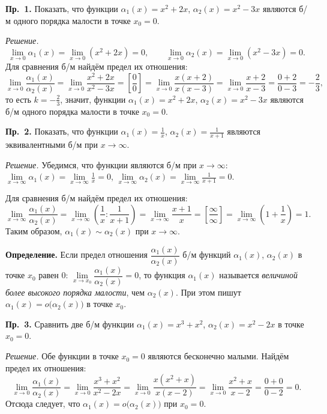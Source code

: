 \documentclass[a4paper,11pt]{article}
\begin{document}
\textbf{Пр.~1.} Показать, что функции $\alpha_1(x) = x^2 + 2x$,
$\alpha_2(x) = x^2 - 3x$ являются б/м одного порядка малости в точке $x_0 = 0$.

\textit{Решение.}
\[
  \lim_{x \to 0} \alpha_1(x) = \lim_{x \to 0} (x^2 + 2x) = 0, \qquad
  \lim_{x \to 0} \alpha_2(x) = \lim_{x \to 0} (x^2 - 3x) = 0.
\]
Для сравнения б/м найдём предел их отношения:
\[
  \lim_{x \to 0} \frac{\alpha_1(x)}{\alpha_2(x)}
  = \lim_{x \to 0} \frac{x^2 + 2x}{x^2 - 3x}
  = \left[\frac{0}{0}\right]
  = \lim_{x \to 0} \frac{x(x + 2)}{x(x - 3)}
  = \lim_{x \to 0} \frac{x + 2}{x - 3}
  = \frac{0 + 2}{0 - 3} = -\frac{2}{3},
\]
то есть $k = -\frac{2}{3}$, значит, функции $\alpha_1(x) = x^2 + 2x$,
$\alpha_2(x) = x^2 - 3x$ являются б/м одного порядка малости в точке $x_0 = 0$.

\textbf{Пр.~2.} Показать, что функции $\alpha_1(x) = \frac{1}{x}$,
$\alpha_2(x) = \frac{1}{x + 1}$ являются эквивалентными б/м при $x \to \infty$.

\textit{Решение.} Убедимся, что функции являются б/м при $x \to \infty$:
$\lim\limits_{x \to \infty} \alpha_1(x) = \lim\limits_{x \to \infty} \frac{1}{x} = 0$,
$\lim\limits_{x \to \infty} \alpha_2(x) = \lim\limits_{x \to \infty} \frac{1}{x + 1} = 0$.

Для сравнения б/м найдём предел их отношения:
\[
  \lim_{x \to \infty} \frac{\alpha_1(x)}{\alpha_2(x)}
  = \lim_{x \to \infty} \left(\frac{1}{x} : \frac{1}{x + 1}\right)
  = \lim_{x \to \infty} \frac{x + 1}{x}
  = \left[\frac{\infty}{\infty}\right]
  = \lim_{x \to \infty} \left(1 + \frac{1}{x}\right) = 1.
\]
Таким образом, $\alpha_1(x) \sim \alpha_2(x)$ при $x \to \infty$.

\begin{opr}
\textbf{Определение.}
  Если предел отношения $\dfrac{\alpha_1(x)}{\alpha_2(x)}$ б/м функций $\alpha_1(x)$,
  $\alpha_2(x)$ в точке $x_0$ равен $0$:
  $\lim\limits_{x \to x_0} \dfrac{\alpha_1(x)}{\alpha_2(x)} = 0$, то функция $\alpha_1(x)$
  называется \emph{величиной более высокого порядка малости}, чем $\alpha_2(x)$.
  При этом пишут $\alpha_1(x) = o\big(\alpha_2(x)\big)$ в точке $x_0$.
\end{opr}

\textbf{Пр.~3.} Сравнить две б/м функции $\alpha_1(x) = x^3 + x^2$,
$\alpha_2(x) = x^2 - 2x$ в точке $x_0 = 0$.

\textit{Решение.} Обе функции в точке $x_0 = 0$ являются бесконечно малыми.
Найдём предел их отношения:
\[
  \lim_{x \to 0} \frac{\alpha_1(x)}{\alpha_2(x)}
  = \lim_{x \to 0} \frac{x^3 + x^2}{x^2 - 2x}
  = \lim_{x \to 0} \frac{x(x^2 + x)}{x(x - 2)}
  = \lim_{x \to 0} \frac{x^2 + x}{x - 2}
  = \frac{0 + 0}{0 - 2} = 0.
\]
Отсюда следует, что $\alpha_1(x) = o\big(\alpha_2(x)\big)$ при $x_0 = 0$.
\end{document}
